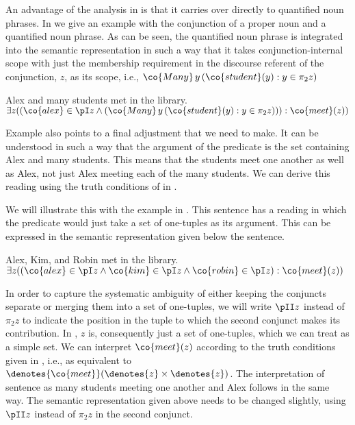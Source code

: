 \documentclass[output=paper]{langsci/langscibook}
\begin{document}
An advantage of the analysis in \citet{Chaves:07} is that it  carries over directly to quantified noun phrases.
In  we give an example with the conjunction of a proper noun and a quantified noun phrase. 
As can be seen, the quantified noun phrase  is integrated into the semantic representation in such a way that it takes conjunction-internal scope with just the membership requirement in the discourse referent of the conjunction, $z$, as its scope, i.e., $\co{Many}\, y \, (\co{student}(y) : y \in \pi_2 z)$

\ea \label{AlexManyCall}
Alex and many students met in the library.\\
$
\exists z
((\co{alex} \in \pI z
\land 
(\co{Many}\, y\, (\co{student}(y): y \in \pi_2 z)))
: \co{meet}(z))
$
\z 

Example  also points to a final adjustment that we need to make. 
It can be understood in such a way that the argument of the predicate  is the set containing Alex and many students. This means that the students meet one another as well as Alex, not just Alex
meeting each of the many students.
We can derive this reading using the truth conditions of  in .

We will illustrate this with the example in  .
This sentence has a reading in which the predicate  would just take a set of one-tuples as its argument. 
This can be expressed in the semantic representation given below the sentence.

\ea \label{alex-kim-robin}
Alex, Kim, and Robin met in the library.\\
$\exists z ((
\co{alex} \in \pI z
\land \co{kim} \in \pI z
\land \co{robin} \in \pI z
): \co{meet}(z)
)$
\z 


In order to capture the systematic ambiguity of either keeping the conjuncts separate or merging them into a set of one-tuples,
we will write $\pII z$ instead of $\pi_2 z$ to indicate the position in the tuple to which the second conjunct makes its contribution.
In , $z$ is, consequently just a set of one-tuples, which we can treat as a simple set. We can interpret $\co{meet}(z)$ according to the truth conditions given in  , i.e., as equivalent to $\denotes{\co{meet}} (\denotes{z} \times \denotes{z})$. 
%
The interpretation of sentence  as many students meeting one another and Alex follows in the same way. 
The semantic representation given above needs to be changed slightly, using $\pII z$ instead of $\pi_2 z$ in the second conjunct.
\end{document}
